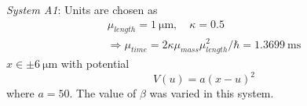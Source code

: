 \documentclass[a4paper, twocolumn]{revtex4-1}
\begin{document}
\textit{System A1}: Units are chosen as
\begin{subequations}
	\begin{gather}
		\mu_{length} = \SI{1}{\micro\meter}, \quad \kappa = 0.5 \label{eq:sys_a1_units_choice}\\
		\Rightarrow \mu_{time} = 2\kappa \mu_{mass}\mu^2_{length} / \hbar = \SI{1.3699}{\milli\second} \label{eq:sys_a1_units_notChoice}
	\end{gather}
\end{subequations}
$x \in \pm \SI{6}{\micro\meter}$ 
with potential 
\begin{equation}
	V(u) = a(x-u)^2
	\label{eq:sys_a1_potential}
\end{equation}
where $a = 50$. The value of $\beta$ was varied in this system. \\
\end{document}
